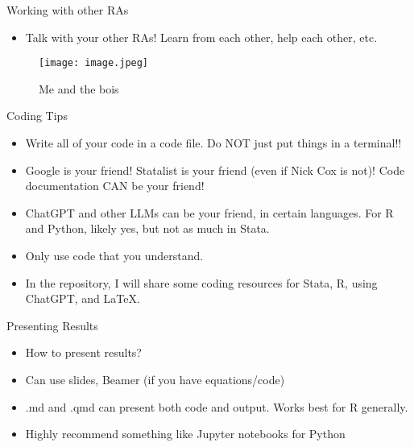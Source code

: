 \documentclass{beamer}
\begin{document}
\begin{frame}{Working with other RAs}
    \begin{itemize}
        \item Talk with your other RAs! Learn from each other, help each other, etc. 
    \end{itemize}
    \begin{figure}
        \centering
        \texttt{[image: image.jpeg]}
        \caption{Me and the bois}
    \end{figure}
    
    
    
\end{frame}

\begin{frame}{Coding Tips}
\begin{itemize}
    \item Write all of your code in a code file. Do NOT just put things in a terminal!!
    \item Google is your friend! Statalist is your friend (even if Nick Cox is not)! Code documentation CAN be your friend!
    \item ChatGPT and other LLMs can be your friend, in certain languages. For R and Python, likely yes, but not as much in Stata. 
    \item Only use code that you understand. 
    \item In the repository, I will share some coding resources for Stata, R, using ChatGPT, and LaTeX. 
\end{itemize}
     
\end{frame}

\begin{frame}{Presenting Results}
    \begin{itemize}
        \item How to present results? 
        \item Can use slides, Beamer (if you have equations/code)
        \item .md and .qmd can present both code and output. Works best for R generally. 
        \item Highly recommend something like Jupyter notebooks for Python
    \end{itemize}
\end{frame}
\end{document}
